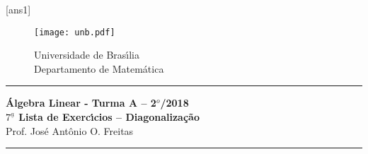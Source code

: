\documentclass[12pt]{exam}
\newcommand{\vesp}[1]{\vspace{ #1  cm}}
\begin{document}
\pagestyle{empty}

[ans1]

\begin{figure}[h]
        \begin{minipage}[c]{1.7cm}
        \texttt{[image: unb.pdf]}
        \end{minipage}%
        \hspace{0pt}
        \begin{minipage}[c]{4in}
          {Universidade de Bras{\'\i}lia} \\
          {Departamento de Matem{\'a}tica}
\end{minipage}
\end{figure}

\vesp{-0.35} \hrule

\begin{center}
{\Large\bf \'Algebra Linear - Turma A -- 2$^{o}$/2018} \\ \vspace{9pt} {\large\bf
  $7^{\underline{a}}$ Lista de Exerc{\'\i}cios -- Diagonaliza\c{c}\~ao}\\ \vspace{9pt} Prof. Jos{\'e} Ant{\^o}nio O. Freitas
\end{center}
\hrule

\vesp{.6}
\end{document}
